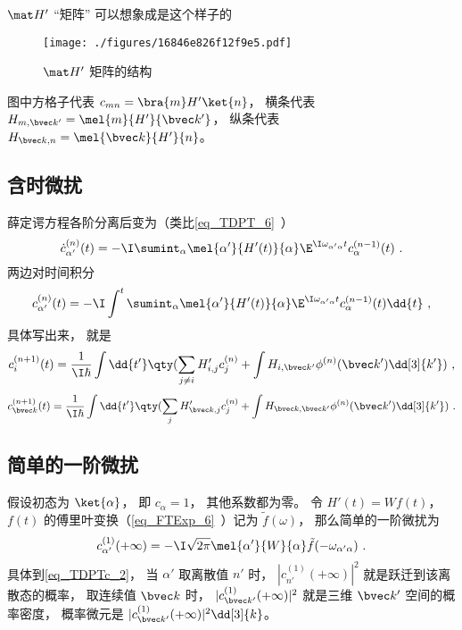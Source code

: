 $\mat H'$  “矩阵” 可以想象成是这个样子的
\begin{figure}[ht]
\centering
\texttt{[image: ./figures/16846e826f12f9e5.pdf]}
\caption{$\mat H'$ 矩阵的结构} \label{fig_TDPTc_1}
\end{figure}
图中方格子代表 $c_{mn} = \bra{m} H' \ket{n}$， 横条代表 $H_{m,\bvec k'} = \mel{m}{H'}{\bvec k'}$，  纵条代表 $H_{\bvec k, n} = \mel{\bvec k}{H'}{n}$。 

\subsection{含时微扰}
薛定谔方程各阶分离后变为（类比\autoref{eq_TDPT_6}~）
\begin{equation}
\dot c_{\alpha'}^{(n)}(t) = -\I \sumint_\alpha \mel{\alpha'}{H'(t)}{\alpha} \E^{\I \omega_{\alpha'\alpha} t} c_{\alpha}^{(n-1)}(t)~.
\end{equation}
两边对时间积分
\begin{equation}
c_{\alpha'}^{(n)}(t) = -\I \int^t \sumint_\alpha \mel{\alpha'}{H'(t)}{\alpha} \E^{\I \omega_{\alpha'\alpha} t} c_{\alpha}^{(n-1)}(t) \dd{t}~,
\end{equation}
具体写出来， 就是
\begin{equation}
c_i^{(n + 1)}(t) = \frac{1}{\I\hbar} \int \dd{t'} \qty(\sum_{j \ne i} H'_{i,j} c_j^{(n)} + \int H_{i,\bvec k'} \phi ^{(n)}(\bvec k') \dd[3]{k'} )~,
\end{equation}
\begin{equation}
c^{(n+1)}_{\bvec k}(t) = \frac{1}{\I\hbar} \int \dd{t'} \qty(\sum_j H'_{\bvec k,j} c_j^{(n)} + \int H_{\bvec k,\bvec k'} \phi ^{(n)}(\bvec k') \dd[3]{k'})~.
\end{equation}

\subsection{简单的一阶微扰}
假设初态为 $\ket{\alpha}$， 即 $c_\alpha = 1$， 其他系数都为零。 令 $H'(t) = W f(t)$， $f(t)$ 的傅里叶变换（\autoref{eq_FTExp_6}~）记为 $\tilde f(\omega)$， 那么简单的一阶微扰为
\begin{equation}\label{eq_TDPTc_1}
c_{\alpha'}^{(1)}(+\infty) = -\I\sqrt{2\pi} \mel{\alpha'}{W}{\alpha} \tilde f(-\omega_{\alpha'\alpha})~.
\end{equation}
具体到\autoref{eq_TDPTc_2}， 当 $\alpha'$ 取离散值 $n'$ 时， $|c_{n'}^{(1)}(+\infty)|^2$ 就是跃迁到该离散态的概率， 取连续值 $\bvec k$ 时， $|c_{\bvec k'}^{(1)}(+\infty)|^2$ 就是三维 $\bvec k'$ 空间的概率密度， 概率微元是 $|c_{\bvec k'}^{(1)}(+\infty)|^2\dd[3]{k}$。

